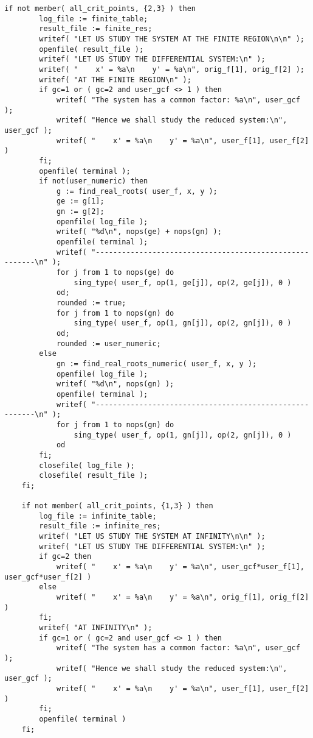 \documentclass[a4paper,10pt]{article}
\begin{document}
\begin{lstlisting}[name=main]
    if not member( all_crit_points, {2,3} ) then
        log_file := finite_table;
        result_file := finite_res;
        writef( "LET US STUDY THE SYSTEM AT THE FINITE REGION\n\n" );
        openfile( result_file );
        writef( "LET US STUDY THE DIFFERENTIAL SYSTEM:\n" );
        writef( "    x' = %a\n    y' = %a\n", orig_f[1], orig_f[2] );
        writef( "AT THE FINITE REGION\n" );
        if gc=1 or ( gc=2 and user_gcf <> 1 ) then
            writef( "The system has a common factor: %a\n", user_gcf );
            writef( "Hence we shall study the reduced system:\n", user_gcf );
            writef( "    x' = %a\n    y' = %a\n", user_f[1], user_f[2] )
        fi;
        openfile( terminal );
        if not(user_numeric) then
            g := find_real_roots( user_f, x, y );
            ge := g[1];
            gn := g[2];
            openfile( log_file );
            writef( "%d\n", nops(ge) + nops(gn) );
            openfile( terminal );
            writef( "--------------------------------------------------------\n" );
            for j from 1 to nops(ge) do
                sing_type( user_f, op(1, ge[j]), op(2, ge[j]), 0 )
            od;
            rounded := true;
            for j from 1 to nops(gn) do
                sing_type( user_f, op(1, gn[j]), op(2, gn[j]), 0 )
            od;
            rounded := user_numeric;
        else
            gn := find_real_roots_numeric( user_f, x, y );
            openfile( log_file );
            writef( "%d\n", nops(gn) );
            openfile( terminal );
            writef( "--------------------------------------------------------\n" );
            for j from 1 to nops(gn) do
                sing_type( user_f, op(1, gn[j]), op(2, gn[j]), 0 )
            od
        fi;
        closefile( log_file );
        closefile( result_file );
    fi;

    if not member( all_crit_points, {1,3} ) then
        log_file := infinite_table;
        result_file := infinite_res;
        writef( "LET US STUDY THE SYSTEM AT INFINITY\n\n" );
        writef( "LET US STUDY THE DIFFERENTIAL SYSTEM:\n" );
        if gc=2 then
            writef( "    x' = %a\n    y' = %a\n", user_gcf*user_f[1], user_gcf*user_f[2] )
        else
            writef( "    x' = %a\n    y' = %a\n", orig_f[1], orig_f[2] )
        fi;
        writef( "AT INFINITY\n" );
        if gc=1 or ( gc=2 and user_gcf <> 1 ) then
            writef( "The system has a common factor: %a\n", user_gcf );
            writef( "Hence we shall study the reduced system:\n", user_gcf );
            writef( "    x' = %a\n    y' = %a\n", user_f[1], user_f[2] )
        fi;
        openfile( terminal )
    fi;


\end{lstlisting}
\end{document}
